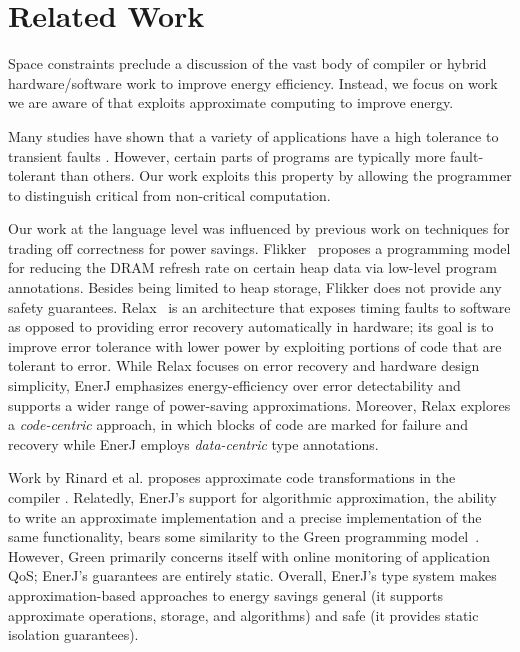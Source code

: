 \section{Related Work}
\label{sec:rel}

Space constraints preclude a discussion of the vast body of compiler
or hybrid hardware/software work to improve energy efficiency.
Instead, we focus on work we are aware of that exploits approximate
computing to improve energy.

Many studies have shown that a variety of applications have a high
tolerance to transient faults \cite{dekruijf-selse09, li07, ersa,
  softcomputing, wong-selse06, qosprof}. However, certain parts of
programs are typically more fault-tolerant than others. Our work
exploits this property by allowing the programmer to distinguish
critical from non-critical computation.

Our work at the language level was influenced by previous work on
techniques for trading off correctness for power
savings. Flikker~\cite{flikker} proposes a programming model for
reducing the DRAM refresh rate on certain heap data via low-level
program annotations. Besides being limited to heap storage, Flikker does not
provide any safety guarantees. Relax~\cite{relax} is an architecture
that exposes timing faults to software as opposed to providing error
recovery automatically in hardware; its goal is to improve error
tolerance with lower power by exploiting portions of code that are
tolerant to error. While Relax focuses on error
recovery and hardware design simplicity, EnerJ emphasizes
energy-efficiency over error detectability and supports a wider range
of power-saving approximations. Moreover, Relax explores a
\emph{code-centric} approach, in which blocks of code are marked for
failure and recovery while EnerJ employs \emph{data-centric} type
annotations.

Work by Rinard et al.
proposes approximate code transformations in the compiler
\cite{perforationtr, qosprof, rinard-onward}.
Relatedly,
EnerJ's support for algorithmic approximation, the ability to write an
approximate implementation and a precise implementation of the same
functionality, bears some similarity to the Green programming
model~\cite{green}. However, Green primarily concerns itself with
online monitoring of application QoS; EnerJ's guarantees are entirely
static. Overall, EnerJ's type system makes approximation-based
approaches to energy savings general (it supports approximate
operations, storage, and algorithms) and safe (it provides static
isolation guarantees).

